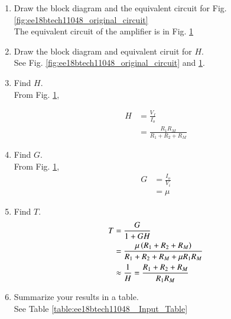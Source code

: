 \begin{enumerate}[label=\arabic*.,ref=\theenumi]

\item Draw the block diagram and the equivalent circuit for Fig. \ref{fig:ee18btech11048_original_circuit}\\
\solution
The equivalent circuit of the amplifier is in Fig. \ref{fig:ee18btech11048_ss_circuit}

\begin{figure}[!ht]
	\begin{center}
		\resizebox{\columnwidth}{!}{}
	\end{center}
\caption{}
\label{fig:ee18btech11048_ss_circuit}
\end{figure}


\item Draw the block diagram and equivalent ciruit for $H$.
\\
\solution See Fig. \ref{fig:ee18btech11048_original_circuit} and \ref{fig:ee18btech11048_ss_circuit}.
\item Find  $H$.
\\
\solution From Fig. \ref{fig:ee18btech11048_ss_circuit},

\begin{align}
H &= \frac{V_{f}}{I_{o}} 
\\
&= \frac{R_1R_M}{R_1+R_2+R_M}
\label{eq:ee18btech11048_H}
\end{align}
%
\item Find  $G$.
\\
\solution From Fig. \ref{fig:ee18btech11048_ss_circuit},
\begin{align}
G &= \frac{I_{o}}{V_{i}} \label{eq:ee18btech11048_G}\\
&= \mu
\end{align}
\item  Find $T$.
\\
\solution
\begin{align}
T &= \frac{G}{1+GH} \label{eq:ee18btech11048_T}
\\
&= \frac{\mu \left(R_1+R_2+R_M\right)}{R_1+R_2+R_M+ \mu R_1R_M}
\\
 &\approx \frac{1}{H}  = \frac{R_1+R_2+R_M}{R_1R_M} 
\end{align}

\item Summarize your results in a table.
\\
\solution See Table \ref{table:ee18btech11048_ Input_Table}



\end{enumerate}
